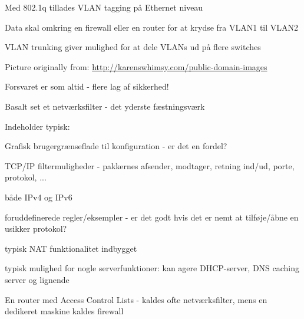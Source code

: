 \documentclass[Screen16to9,17pt]{foils}
\begin{document}


\begin{list1}
\item Med 802.1q tillades VLAN tagging på Ethernet niveau
\item Data skal omkring en firewall eller en router for at krydse fra VLAN1 til VLAN2
\item VLAN trunking giver mulighed for at dele VLANs ud på flere switches
\end{list1}



\centerline{Picture originally from: \url{http://karenswhimsy.com/public-domain-images}}



\centerline{Forsvaret er som altid - flere lag af sikkerhed! }



\begin{list1}
\item Basalt set et netværksfilter - det yderste fæstningsværk
\item Indeholder typisk:
  \begin{list2}
   \item Grafisk brugergrænseflade til konfiguration - er det en
   fordel?
\item TCP/IP filtermuligheder - pakkernes afsender, modtager, retning
  ind/ud, porte, protokol, ...
\item både IPv4 og IPv6
\item foruddefinerede regler/eksempler - er det godt hvis det er nemt
  at tilføje/åbne en usikker protokol?
\item typisk NAT funktionalitet indbygget
\item typisk mulighed for nogle serverfunktioner: kan agere
  DHCP-server, DNS caching server og lignende
  \end{list2}
\item En router med Access Control Lists - kaldes ofte netværksfilter,
  mens en dedikeret maskine kaldes firewall
\end{list1}


\end{document}
